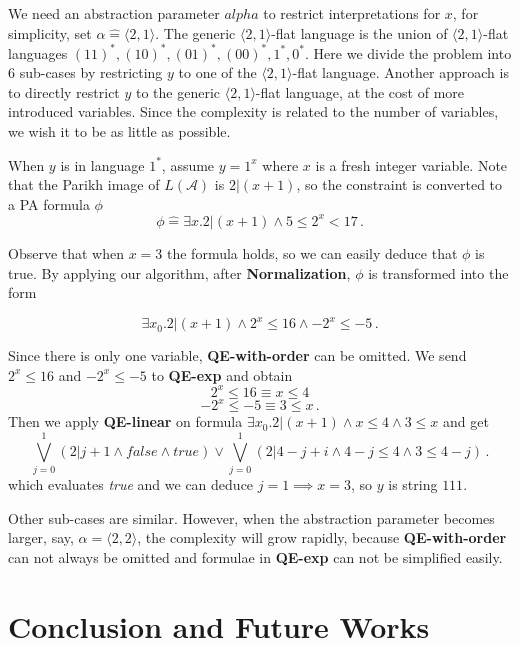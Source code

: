 \documentclass[runningheads]{llncs}
\newcommand{\Def}{\hat{=}}
\begin{document}
We need an abstraction parameter $alpha$ to restrict interpretations
for $x$, for simplicity, set $\alpha\Def \langle 2,1 \rangle$.
The generic $\langle 2,1 \rangle$-flat language is the union of 
$\langle 2,1 \rangle$-flat languages $(11)^*,(10)^*,(01)^*,(00)^*,1^*,0^*$.
Here we divide the problem into 6 sub-cases by restricting $y$
to one of the $\langle 2,1 \rangle$-flat language.
Another approach is to directly restrict $y$ to 
the generic $\langle 2,1 \rangle$-flat language,
at the cost of more introduced variables.
Since the complexity is related to the number of variables,
we wish it to be as little as possible.

When $y$ is in language $1^*$, assume $y = 1^x$ where $x$
is a fresh integer variable.
Note that the Parikh image of $L(\mathcal{A})$ is $2|( x+1)$, 
so the constraint is converted to a PA formula $\phi$
$$\phi\Def \exists x. 2|(x+1) \wedge 5 \le 2^{x} < 17\,.$$

Observe that when $x=3$ the formula holds,
so we can easily deduce that $\phi$ is true.  
By applying our algorithm,
after \textbf{Normalization},
$\phi$ is transformed into the form 

$$\exists x_0. 2|(x+1)\wedge  2^{x}\le 16 \wedge -2^{x}\le -5\,.$$

Since there is only one variable, 
\textbf{QE-with-order} can be omitted.
We send $2^x\le 16$ and $-2^x \le -5$ to \textbf{QE-exp} and obtain
$$2^x\le 16 \equiv x \le 4$$
$$-2^x\le -5 \equiv 3\le x\,.$$ 
Then we apply \textbf{QE-linear} on formula $\exists x_0. 2|(x+1) \wedge x\le 4 \wedge 3\le x$ and get
$$\bigvee_{j=0}^1(2| j+1 \wedge \textit{false} \wedge \textit{true})\vee \bigvee_{j=0}^1 (2|4-j+i\wedge 4-j\le 4 \wedge 3\le 4-j) \,.$$
which evaluates \textit{true} and we can deduce $j=1\implies x=3$, so $y$ is string $111$.

Other sub-cases are similar. However, when the abstraction parameter becomes larger,
say, $\alpha =\langle 2,2 \rangle$,
the complexity will grow rapidly,
because \textbf{QE-with-order} can not always be omitted and formulae in \textbf{QE-exp} can not be simplified easily.

\section{Conclusion and Future Works}



\end{document}
